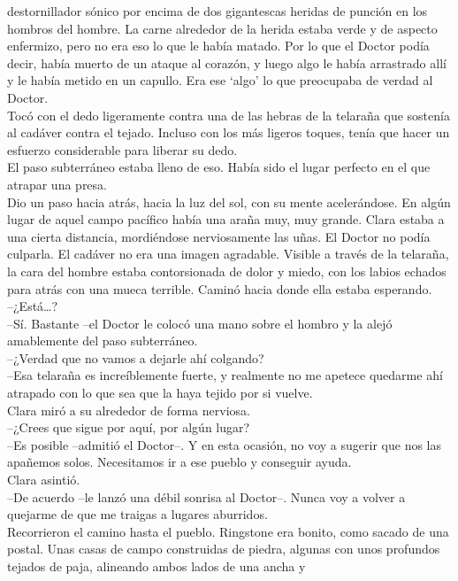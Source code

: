 {destornillador sónico por encima de dos gigantescas heridas de punción
en los hombros del hombre. La carne alrededor de la herida estaba verde
y de aspecto enfermizo, pero no era eso lo que le había matado. Por lo
que el Doctor podía decir, había muerto de un ataque al corazón, y luego
algo le había arrastrado allí y le había metido en un capullo. Era ese
`algo' lo que preocupaba de verdad al Doctor.\\
Tocó con el dedo ligeramente contra una de las hebras de la telaraña que
sostenía al cadáver contra el tejado. Incluso con los más ligeros
toques, tenía que hacer un esfuerzo considerable para liberar su dedo.\\
El paso subterráneo estaba lleno de eso. Había sido el lugar perfecto en
el que atrapar una presa.\\
Dio un paso hacia atrás, hacia la luz del sol, con su mente
acelerándose. En algún lugar de aquel campo pacífico había una araña
muy, muy grande. Clara estaba a una cierta distancia, mordiéndose
nerviosamente las uñas. El Doctor no podía culparla. El cadáver no era
una imagen agradable. Visible a través de la telaraña, la cara del
hombre estaba contorsionada de dolor y miedo, con los labios echados
para atrás con una mueca terrible. Caminó hacia donde ella estaba
esperando.\\
--¿Está\ldots{}?\\
--Sí. Bastante --el Doctor le colocó una mano sobre el hombro y la alejó
amablemente del paso subterráneo.\\
--¿Verdad que no vamos a dejarle ahí colgando?\\
--Esa telaraña es increíblemente fuerte, y realmente no me apetece
quedarme ahí atrapado con lo que sea que la haya tejido por si vuelve.\\
Clara miró a su alrededor de forma nerviosa.\\
--¿Crees que sigue por aquí, por algún lugar?\\
--Es posible --admitió el Doctor--. Y en esta ocasión, no voy a sugerir
que nos las apañemos solos. Necesitamos ir a ese pueblo y conseguir
ayuda.\\
Clara asintió.\\
--De acuerdo --le lanzó una débil sonrisa al Doctor--. Nunca voy a
volver a quejarme de que me traigas a lugares aburridos.\\
Recorrieron el camino hasta el pueblo. Ringstone era bonito, como sacado
de una postal. Unas casas de campo construidas de piedra, algunas con
unos profundos tejados de paja, alineando ambos lados de una ancha y
}
